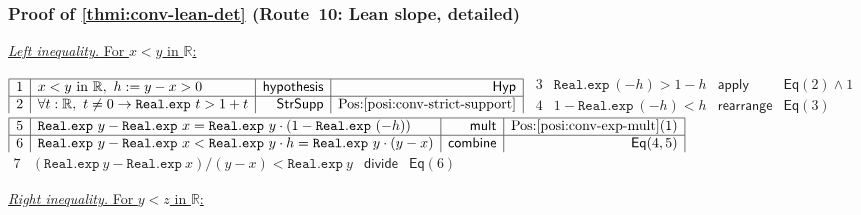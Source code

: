 \documentclass[11pt,reqno]{amsart}
\providecommand{\R}{\mathbb{R}}
\theoremstyle{redplain}
\numberwithin{equation}{section}
\begin{document}
\subsubsection*{Proof of \autoref{thmi:conv-lean-det} (Route~10: Lean slope,
detailed)}

\medskip \underline{\emph{Left inequality.} For $x < y$ in $\R$:} \medskip

\begin{center}
$%
\begin{array}{|c|l|r|r|}
\hline
1 & x<y\ \text{in}\ \R,\ h:=y-x>0 & \mathsf{hypothesis} & \mathsf{Hyp} \\ 
\hline
2 & \forall t:\mathbb{R},\ t\neq 0\rightarrow \mathtt{Real.exp}\ t>1+t & 
\mathsf{StrSupp} & \mbox{Pos:\ref{posi:conv-strict-support}}%
\end{array}%
$ \noindent $%
\begin{array}{|c|l|r|r|}
\hline
3 & \mathtt{Real.exp}\ (-h)>1-h & \mathsf{apply} & \mathsf{Eq}(2)\wedge 1 \\ 
\hline
4 & 1-\mathtt{Real.exp}\ (-h)<h & \mathsf{rearrange} & \mathsf{Eq}(3)%
\end{array}%
$ \noindent $%
\begin{array}{|c|l|r|r|}
\hline
5 & \mathtt{Real.exp}\ y-\mathtt{Real.exp}\ x=\mathtt{Real.exp}\ y\cdot (1-%
\mathtt{Real.exp}\ (-h)) & \mathsf{mult} & \mbox{Pos:%
\ref{posi:conv-exp-mult}(1)} \\ \hline
6 & \mathtt{Real.exp}\ y-\mathtt{Real.exp}\ x<\mathtt{Real.exp}\ y\cdot h=%
\mathtt{Real.exp}\ y\cdot (y-x) & \mathsf{combine} & \mathsf{Eq}(4,5)%
\end{array}%
$ \noindent $%
\begin{array}{|c|l|r|r|}
\hline
7 & (\mathtt{Real.exp}\ y-\mathtt{Real.exp}\ x)/(y-x)<\mathtt{Real.exp}\ y & 
\mathsf{divide} & \mathsf{Eq}(6)%
\end{array}%
$
\end{center}

\medskip \underline{\emph{Right inequality.} For $y < z$ in $\R$:} \medskip
\end{document}

